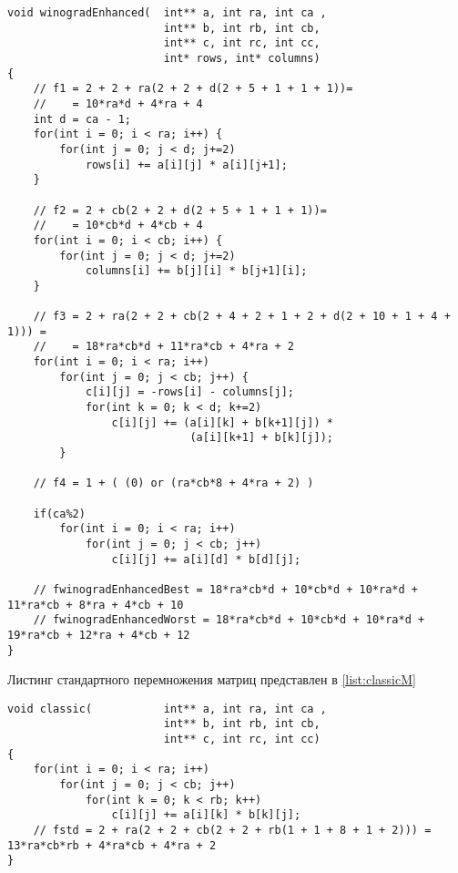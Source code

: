 \begin{lstlisting}[style=CStyle, caption={Winograd enhanced algorithm},
                    label={list:winogradEnh}]
void winogradEnhanced(  int** a, int ra, int ca , 
                        int** b, int rb, int cb, 
                        int** c, int rc, int cc,
                        int* rows, int* columns)
{
    // f1 = 2 + 2 + ra(2 + 2 + d(2 + 5 + 1 + 1 + 1))=
    //    = 10*ra*d + 4*ra + 4
    int d = ca - 1;
    for(int i = 0; i < ra; i++) {
        for(int j = 0; j < d; j+=2)
            rows[i] += a[i][j] * a[i][j+1];
    }

    // f2 = 2 + cb(2 + 2 + d(2 + 5 + 1 + 1 + 1))=
    //    = 10*cb*d + 4*cb + 4
    for(int i = 0; i < cb; i++) {
        for(int j = 0; j < d; j+=2)
            columns[i] += b[j][i] * b[j+1][i];
    }

    // f3 = 2 + ra(2 + 2 + cb(2 + 4 + 2 + 1 + 2 + d(2 + 10 + 1 + 4 + 1))) =
    //    = 18*ra*cb*d + 11*ra*cb + 4*ra + 2
    for(int i = 0; i < ra; i++)
        for(int j = 0; j < cb; j++) {
            c[i][j] = -rows[i] - columns[j];
            for(int k = 0; k < d; k+=2)
                c[i][j] += (a[i][k] + b[k+1][j]) * 
                            (a[i][k+1] + b[k][j]);
        }

    // f4 = 1 + ( (0) or (ra*cb*8 + 4*ra + 2) )

    if(ca%2)
        for(int i = 0; i < ra; i++)
            for(int j = 0; j < cb; j++)
                c[i][j] += a[i][d] * b[d][j];

    // fwinogradEnhancedBest = 18*ra*cb*d + 10*cb*d + 10*ra*d + 11*ra*cb + 8*ra + 4*cb + 10
    // fwinogradEnhancedWorst = 18*ra*cb*d + 10*cb*d + 10*ra*d + 19*ra*cb + 12*ra + 4*cb + 12
}
\end{lstlisting}

Листинг стандартного перемножения матриц представлен в \ref{list:classicM}

\begin{lstlisting}[style=CStyle, caption={Classic matrix multiplication},
                    label={list:classicM}]
void classic(           int** a, int ra, int ca , 
                        int** b, int rb, int cb, 
                        int** c, int rc, int cc)
{
    for(int i = 0; i < ra; i++)
        for(int j = 0; j < cb; j++)
            for(int k = 0; k < rb; k++)
                c[i][j] += a[i][k] * b[k][j];
    // fstd = 2 + ra(2 + 2 + cb(2 + 2 + rb(1 + 1 + 8 + 1 + 2))) = 13*ra*cb*rb + 4*ra*cb + 4*ra + 2
}
\end{lstlisting}


